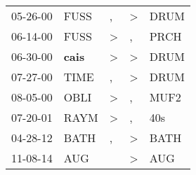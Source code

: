 \begin{supertabular}{p{0.07\textwidth}p{0.06\textwidth}p{0.02\textwidth}p{0.02\textwidth}p{0.06\textwidth}}
 05-26-00\textsuperscript{} &           FUSS\textsuperscript{} &             , &  \textgreater &  DRUM\textsuperscript{} \\
 06-14-00\textsuperscript{} &           FUSS\textsuperscript{} &  \textgreater &             , &  PRCH\textsuperscript{} \\
 06-30-00\textsuperscript{} &  \textbf{cais\textsuperscript{}} &  \textgreater &  \textgreater &  DRUM\textsuperscript{} \\
 07-27-00\textsuperscript{} &           TIME\textsuperscript{} &             , &  \textgreater &  DRUM\textsuperscript{} \\
 08-05-00\textsuperscript{} &           OBLI\textsuperscript{} &  \textgreater &             , &  MUF2\textsuperscript{} \\
 07-20-01\textsuperscript{} &           RAYM\textsuperscript{} &  \textgreater &             , &   40s\textsuperscript{} \\
 04-28-12\textsuperscript{} &           BATH\textsuperscript{} &             , &  \textgreater &  BATH\textsuperscript{} \\
 11-08-14\textsuperscript{} &            AUG\textsuperscript{} &               &  \textgreater &   AUG\textsuperscript{} \\
\end{supertabular}

